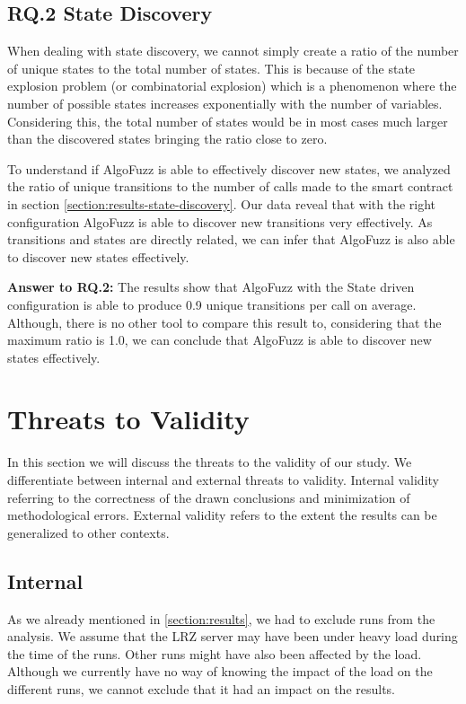 \subsection*{RQ.2 State Discovery}
When dealing with state discovery, we cannot simply create a ratio of the number of unique states to the total number of states.
This is because of the state explosion problem (or combinatorial explosion) which is a phenomenon where the number of possible states increases exponentially with the number of variables.
Considering this, the total number of states would be in most cases much larger than the discovered states bringing the ratio close to zero.

To understand if AlgoFuzz is able to effectively discover new states, we analyzed the ratio of unique transitions to the number of calls made to the smart contract in section \ref{section:results-state-discovery}.
Our data reveal that with the right configuration AlgoFuzz is able to discover new transitions very effectively.
As transitions and states are directly related, we can infer that AlgoFuzz is also able to discover new states effectively.

\begin{mybox}
    \textbf{Answer to RQ.2:} The results show that AlgoFuzz with the State driven configuration is able to produce 0.9 unique transitions per call on average.
    Although, there is no other tool to compare this result to, considering that the maximum ratio is 1.0, we can conclude that AlgoFuzz is able to discover new states effectively.
\end{mybox}

\section{Threats to Validity}
In this section we will discuss the threats to the validity of our study.
We differentiate between internal and external threats to validity.
Internal validity referring to the correctness of the drawn conclusions and minimization of methodological errors.
External validity refers to the extent the results can be generalized to other contexts.

\subsection*{Internal}
As we already mentioned in \ref{section:results}, we had to exclude runs from the analysis.
We assume that the LRZ server may have been under heavy load during the time of the runs.
Other runs might have also been affected by the load.
Although we currently have no way of knowing the impact of the load on the different runs, we cannot exclude that it had an impact on the results.

